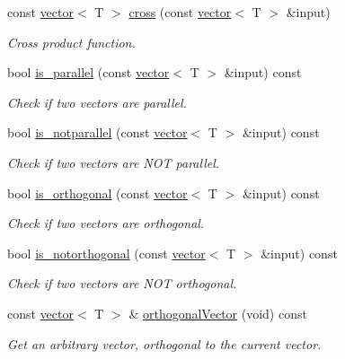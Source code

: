 \begin{DoxyCompactItemize}
const \hyperlink{classddd_1_1vector}{vector}$<$ T $>$ \hyperlink{classddd_1_1vector_a27ac4cb7a469642d497cfe070935ab4b}{cross} (const \hyperlink{classddd_1_1vector}{vector}$<$ T $>$ \&input)
\begin{DoxyCompactList}\small\item\em Cross product function. \end{DoxyCompactList}\item 
bool \hyperlink{classddd_1_1vector_ac3fc063a06940c9893579b1f53f1dda0}{is\+\_\+parallel} (const \hyperlink{classddd_1_1vector}{vector}$<$ T $>$ \&input) const
\begin{DoxyCompactList}\small\item\em Check if two vectors are parallel. \end{DoxyCompactList}\item 
bool \hyperlink{classddd_1_1vector_a4d7791d777455365aed4a1476da78d67}{is\+\_\+notparallel} (const \hyperlink{classddd_1_1vector}{vector}$<$ T $>$ \&input) const
\begin{DoxyCompactList}\small\item\em Check if two vectors are N\+OT parallel. \end{DoxyCompactList}\item 
bool \hyperlink{classddd_1_1vector_aa4093c63121a3787e4b43581f23c3e0a}{is\+\_\+orthogonal} (const \hyperlink{classddd_1_1vector}{vector}$<$ T $>$ \&input) const
\begin{DoxyCompactList}\small\item\em Check if two vectors are orthogonal. \end{DoxyCompactList}\item 
bool \hyperlink{classddd_1_1vector_ab08843c258a0e50ff940ece9c03ad774}{is\+\_\+notorthogonal} (const \hyperlink{classddd_1_1vector}{vector}$<$ T $>$ \&input) const
\begin{DoxyCompactList}\small\item\em Check if two vectors are N\+OT orthogonal. \end{DoxyCompactList}\item 
\mbox{\label{classddd_1_1vector_a3ad5fe35a6b91b17a45af430a2622380}} 
const \hyperlink{classddd_1_1vector}{vector}$<$ T $>$ \& \hyperlink{classddd_1_1vector_a3ad5fe35a6b91b17a45af430a2622380}{orthogonal\+Vector} (void) const
\begin{DoxyCompactList}\small\item\em Get an arbitrary vector, orthogonal to the current vector. \end{DoxyCompactList}\item 

\end{DoxyCompactItemize}
